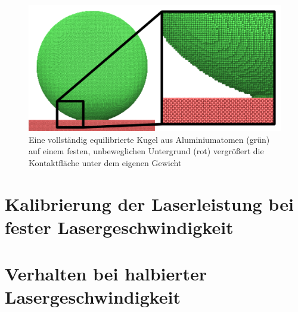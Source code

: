 		\begin{figure}[!ht]
			\centering
			\includegraphics[width=\textwidth]{chapter/main/single/img/equilibrated_sphere.zoom.png}
			\caption{Eine vollständig equilibrierte Kugel aus Aluminiumatomen (grün) auf einem
			festen, unbeweglichen Untergrund (rot) vergrößert die Kontaktfläche unter dem eigenen
			Gewicht}
			\label{fig:equilibrated_sample}
		\end{figure}


\section{Kalibrierung der Laserleistung bei fester Lasergeschwindigkeit}

\section{Verhalten bei halbierter Lasergeschwindigkeit}

